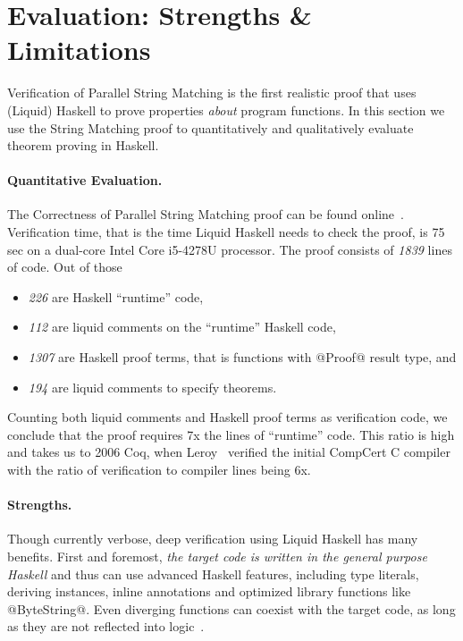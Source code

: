\section{Evaluation: Strengths \& Limitations}\label{sec:stringmatcher:evaluation}

Verification of Parallel String Matching is the first realistic
proof that uses (Liquid) Haskell
to prove properties \textit{about} program functions.
%
In this section we use the String Matching proof
to quantitatively and qualitatively evaluate theorem proving in Haskell.

\paragraph{Quantitative Evaluation.}
The Correctness of Parallel String Matching proof
can be found online~\cite{implementation}.
%
Verification time, that is the time Liquid Haskell needs to check the proof,
is 75 sec on a dual-core Intel Core i5-4278U processor.
%
The proof consists of \textit{1839} lines of code.
%
Out of those
\begin{itemize}
\item \textit{226} are Haskell ``runtime'' code,
\item \textit{112} are liquid comments on the ``runtime'' Haskell code,
\item \textit{1307} are Haskell proof terms, that is functions with @Proof@ result type, and
\item \textit{194}  are liquid comments to specify theorems.
\end{itemize}
Counting both liquid comments and Haskell proof terms as verification code,
we conclude that the proof requires 7x the lines of ``runtime'' code.
%
This ratio is high and takes us to 2006 Coq,
when Leroy~\cite{Leroy06formalcertification} verified
the initial CompCert C compiler with
the ratio of verification to compiler lines being 6x.

\paragraph{Strengths.}
Though currently verbose,
deep verification using Liquid Haskell has many benefits.
%
First and foremost,
\textit{the target code is written in the general purpose Haskell}
and thus can use advanced Haskell features, including
type literals, deriving instances, inline annotations
and optimized library functions like @ByteString@.
Even diverging functions can coexist with the target code, as long
as they are not reflected into logic~\cite{Vazou14}.

